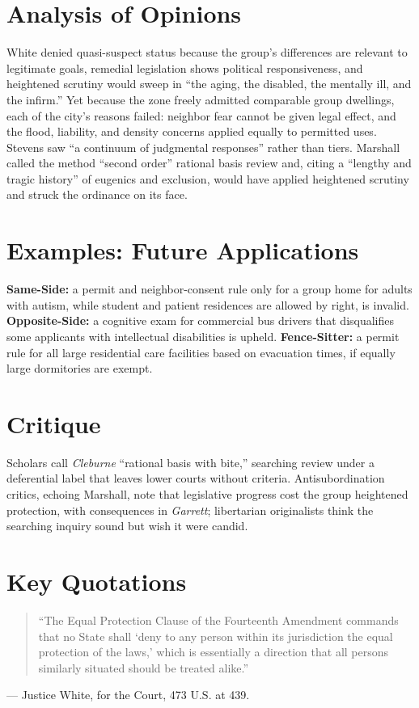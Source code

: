 \documentclass[12pt]{article}
\begin{document}
\section{Analysis of Opinions}
White denied quasi-suspect status because the group's differences are relevant to legitimate goals, remedial legislation shows political responsiveness, and heightened scrutiny would sweep in ``the aging, the disabled, the mentally ill, and the infirm.'' Yet because the zone freely admitted comparable group dwellings, each of the city's reasons failed: neighbor fear cannot be given legal effect, and the flood, liability, and density concerns applied equally to permitted uses. Stevens saw ``a continuum of judgmental responses'' rather than tiers. Marshall called the method ``second order'' rational basis review and, citing a ``lengthy and tragic history'' of eugenics and exclusion, would have applied heightened scrutiny and struck the ordinance on its face.

\section{Examples: Future Applications}
\textbf{Same-Side:} a permit and neighbor-consent rule only for a group home for adults with autism, while student and patient residences are allowed by right, is invalid. \textbf{Opposite-Side:} a cognitive exam for commercial bus drivers that disqualifies some applicants with intellectual disabilities is upheld. \textbf{Fence-Sitter:} a permit rule for all large residential care facilities based on evacuation times, if equally large dormitories are exempt.

\section{Critique}
Scholars call \textit{Cleburne} ``rational basis with bite,'' searching review under a deferential label that leaves lower courts without criteria. Antisubordination critics, echoing Marshall, note that legislative progress cost the group heightened protection, with consequences in \textit{Garrett}; libertarian originalists think the searching inquiry sound but wish it were candid.

\section{Key Quotations}
\begin{quote}
``The Equal Protection Clause of the Fourteenth Amendment commands that no State shall `deny to any person within its jurisdiction the equal protection of the laws,' which is essentially a direction that all persons similarly situated should be treated alike.''
\end{quote}
\noindent --- Justice White, for the Court, 473 U.S. at 439.
\end{document}
